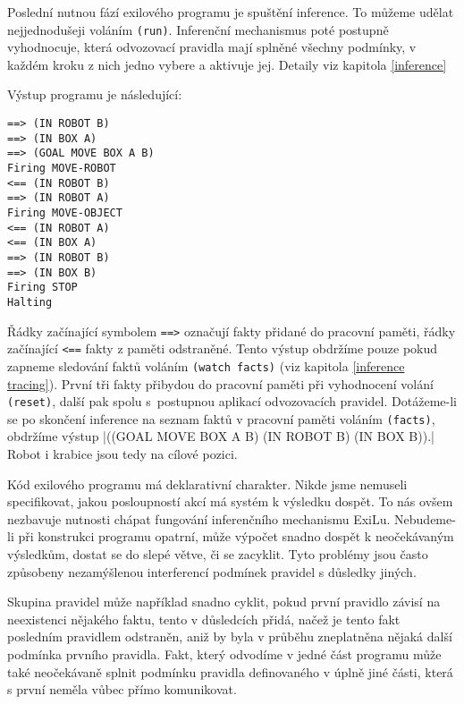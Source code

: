 Poslední nutnou fází exilového programu je spuštění inference. To můžeme udělat
nejjednodušeji voláním \verb|(run)|. Inferenční mechanismus poté postupně
vyhodnocuje, která odvozovací pravidla mají splněné všechny podmínky, v každém
kroku z nich jedno vybere a aktivuje jej. Detaily viz kapitola \ref{inference}

Výstup programu je následující:
\begin{verbatim}
==> (IN ROBOT B)
==> (IN BOX A)
==> (GOAL MOVE BOX A B)
Firing MOVE-ROBOT
<== (IN ROBOT B)
==> (IN ROBOT A)
Firing MOVE-OBJECT
<== (IN ROBOT A)
<== (IN BOX A)
==> (IN ROBOT B)
==> (IN BOX B)
Firing STOP
Halting
\end{verbatim}
Řádky začínající symbolem \verb|==>| označují fakty přidané do pracovní paměti,
řádky začínající \verb|<==| fakty z paměti odstraněné. Tento výstup obdržíme
pouze pokud zapneme sledování faktů voláním \verb|(watch facts)| (viz kapitola
\ref{inference tracing}). První tři fakty přibydou do pracovní paměti při
vyhodnocení volání \verb|(reset)|, další pak spolu s~postupnou aplikací
odvozovacích pravidel. Dotážeme-li se po skončení inference na seznam faktů v
pracovní paměti voláním \verb|(facts)|, obdržíme výstup
\cl|((GOAL MOVE BOX A B) (IN ROBOT B) (IN BOX B)).|
Robot i krabice jsou tedy na cílové pozici.

Kód exilového programu má deklarativní charakter. Nikde jsme nemuseli
specifikovat, jakou posloupností akcí má systém k výsledku dospět. To nás ovšem
nezbavuje nutnosti chápat fungování inferenčního mechanismu ExiLu. Nebudeme-li
při konstrukci programu opatrní, může výpočet snadno dospět k neočekávaným
výsledkům, dostat se do slepé větve, či se zacyklit. Tyto problémy jsou často
způsobeny nezamýšlenou interferencí podmínek pravidel s důsledky jiných.

\FloatBarrier

Skupina pravidel může například snadno cyklit, pokud první pravidlo závisí na
neexistenci nějakého faktu, tento v důsledcích přidá, načež je tento fakt
posledním pravidlem odstraněn, aniž by byla v průběhu zneplatněna nějaká další
podmínka prvního pravidla. Fakt, který odvodíme v jedné část programu může také
neočekávaně splnit podmínku pravidla definovaného v úplně jiné části, která s
první neměla vůbec přímo komunikovat.
